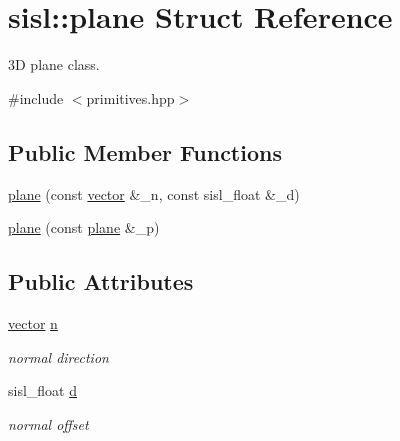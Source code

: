\hypertarget{structsisl_1_1plane}{}\section{sisl\+:\+:plane Struct Reference}
\label{structsisl_1_1plane}


3D plane class.  




{\ttfamily \#include $<$primitives.\+hpp$>$}

\subsection*{Public Member Functions}
\begin{DoxyCompactItemize}
\item 
\hyperlink{structsisl_1_1plane_af0b08037a91ded2c568f2a5d99418143}{plane} (const \hyperlink{namespacesisl_a2069bd5374a9be042ff3ce3306d41e1a}{vector} \&\+\_\+n, const sisl\+\_\+float \&\+\_\+d)
\item 
\hyperlink{structsisl_1_1plane_a6eea6dde0d9235a1afd383f98cfacec7}{plane} (const \hyperlink{structsisl_1_1plane}{plane} \&\+\_\+p)
\end{DoxyCompactItemize}
\subsection*{Public Attributes}
\begin{DoxyCompactItemize}
\item 
\mbox{\label{structsisl_1_1plane_abbc8429614751645cc8d3eb5968926f7}} 
\hyperlink{namespacesisl_a2069bd5374a9be042ff3ce3306d41e1a}{vector} \hyperlink{structsisl_1_1plane_abbc8429614751645cc8d3eb5968926f7}{n}
\begin{DoxyCompactList}\small\item\em normal direction \end{DoxyCompactList}\item 
\mbox{\label{structsisl_1_1plane_a6eadb141c9042a48ec96577869668528}} 
sisl\+\_\+float \hyperlink{structsisl_1_1plane_a6eadb141c9042a48ec96577869668528}{d}
\begin{DoxyCompactList}\small\item\em normal offset \end{DoxyCompactList}\end{DoxyCompactItemize}


